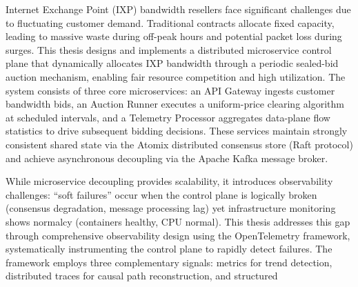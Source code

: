 \begin{abstractEn}
  Internet Exchange Point (IXP) bandwidth resellers face significant challenges due to fluctuating customer demand. Traditional contracts allocate fixed capacity, leading to massive waste during off-peak hours and potential packet loss during surges. This thesis designs and implements a distributed microservice control plane that dynamically allocates IXP bandwidth through a periodic sealed-bid auction mechanism, enabling fair resource competition and high utilization. The system consists of three core microservices: an API Gateway ingests customer bandwidth bids, an Auction Runner executes a uniform-price clearing algorithm at scheduled intervals, and a Telemetry Processor aggregates data-plane flow statistics to drive subsequent bidding decisions. These services maintain strongly consistent shared state via the Atomix distributed consensus store (Raft protocol) and achieve asynchronous decoupling via the Apache Kafka message broker.

  While microservice decoupling provides scalability, it introduces observability challenges: ``soft failures'' occur when the control plane is logically broken (consensus degradation, message processing lag) yet infrastructure monitoring shows normalcy (containers healthy, CPU normal). This thesis addresses this gap through comprehensive observability design using the OpenTelemetry framework, systematically instrumenting the control plane to rapidly detect failures. The framework employs three complementary signals: metrics for trend detection, distributed traces for causal path reconstruction, and structured
\end{abstractEn}